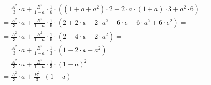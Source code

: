 \begin{task}
\begin{align*}
 &=\frac{A^2}{3}\cdot a +\frac{B^2}{1 - a} \cdot \frac{1}{6} \cdot \left( \left(1 +a + a^2 \right)\cdot 2
 - 2\cdot a \cdot \left( 1 + a \right) \cdot 3
 + a^2 \cdot 6 \right)=\\  
 &=\frac{A^2}{3}\cdot a
 +\frac{B^2}{1 - a} \cdot \frac{1}{6} \cdot \left( 2 +2\cdot a + 2\cdot a^2 - 6\cdot a - 6\cdot a^2 + 6 \cdot a^2 \right)=\\
 &=\frac{A^2}{3}\cdot a
 +\frac{B^2}{1 - a} \cdot \frac{1}{6} \cdot \left( 2 - 4 \cdot a + 2\cdot a^2 \right)=\\
 &=\frac{A^2}{3}\cdot a +\frac{B^2}{1 - a} \cdot \frac{1}{3} \cdot \left( 1 - 2 \cdot a + a^2 \right)=\\
 &=\frac{A^2}{3}\cdot a +\frac{B^2}{1 - a} \cdot \frac{1}{3} \cdot \left( 1 - a \right)^2=\\
 &=\frac{A^2}{3}\cdot a + \frac{B^2}{3} \cdot \left( 1 - a \right)
\end{align*}


\end{task}
